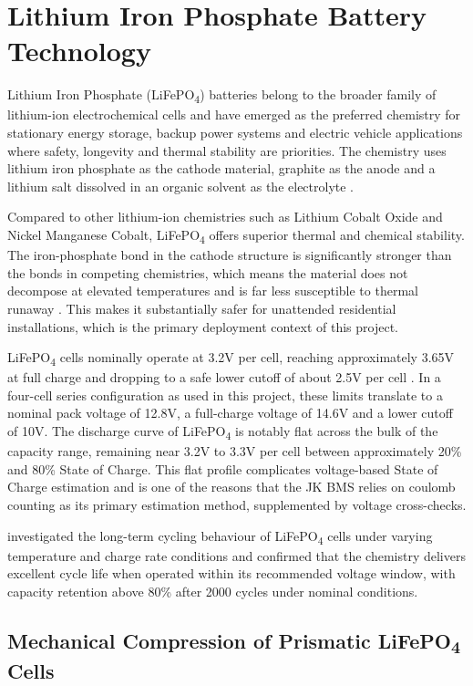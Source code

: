 \documentclass[12pt, a4paper]{report}
\begin{document}
\section{Lithium Iron Phosphate Battery Technology}

Lithium Iron Phosphate (LiFePO\textsubscript{4}) batteries belong to the
broader family of lithium-ion electrochemical cells and have emerged as
the preferred chemistry for stationary energy storage, backup power systems
and electric vehicle applications where safety, longevity and thermal
stability are priorities. The chemistry uses lithium iron phosphate as the
cathode material, graphite as the anode and a lithium salt dissolved in an
organic solvent as the electrolyte \citep{nitta2015}.

Compared to other lithium-ion chemistries such as Lithium Cobalt Oxide and
Nickel Manganese Cobalt, LiFePO\textsubscript{4} offers superior thermal
and chemical stability. The iron-phosphate bond in the cathode structure is
significantly stronger than the bonds in competing chemistries, which means
the material does not decompose at elevated temperatures and is far less
susceptible to thermal runaway \citep{dini2024}. This makes it
substantially safer for unattended residential installations, which is
the primary deployment context of this project.

LiFePO\textsubscript{4} cells nominally operate at 3.2V per cell, reaching
approximately 3.65V at full charge and dropping to a safe lower cutoff of
about 2.5V per cell \citep{piller2001}. In a four-cell series configuration
as used in this project, these limits translate to a nominal pack voltage
of 12.8V, a full-charge voltage of 14.6V and a lower cutoff of 10V.
The discharge curve of LiFePO\textsubscript{4} is notably flat across the
bulk of the capacity range, remaining near 3.2V to 3.3V per cell between
approximately 20\% and 80\% State of Charge. This flat profile
complicates voltage-based State of Charge estimation and is one of the
reasons that the JK BMS relies on coulomb counting as its primary
estimation method, supplemented by voltage cross-checks.

\citet{pillet2025} investigated the long-term cycling behaviour of
LiFePO\textsubscript{4} cells under varying temperature and charge rate
conditions and confirmed that the chemistry delivers excellent cycle life
when operated within its recommended voltage window, with capacity
retention above 80\% after 2000 cycles under nominal conditions.

\subsection{Mechanical Compression of Prismatic LiFePO\texorpdfstring{\textsubscript{4}}{4} Cells}
\end{document}
